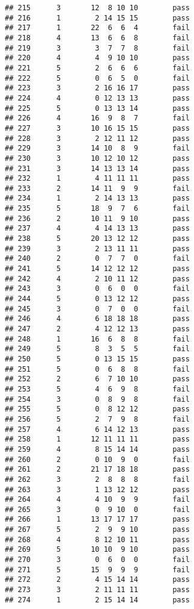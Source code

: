 \documentclass[
]{article}
\begin{document}
\begin{verbatim}
## 215      3       12  8 10 10        pass
## 216      1        2 14 15 15        pass
## 217      1       22  6  6  4        fail
## 218      4       13  6  6  8        fail
## 219      3        3  7  7  8        fail
## 220      4        4  9 10 10        pass
## 221      5        2  6  6  6        fail
## 222      5        0  6  5  0        fail
## 223      3        2 16 16 17        pass
## 224      4        0 12 13 13        pass
## 225      5        0 13 13 14        pass
## 226      4       16  9  8  7        fail
## 227      3       10 16 15 15        pass
## 228      3        2 12 11 12        pass
## 229      3       14 10  8  9        fail
## 230      3       10 12 10 12        pass
## 231      3       14 13 13 14        pass
## 232      1        4 11 11 11        pass
## 233      2       14 11  9  9        fail
## 234      1        2 14 13 13        pass
## 235      5       18  9  7  6        fail
## 236      2       10 11  9 10        pass
## 237      4        4 14 13 13        pass
## 238      5       20 13 12 12        pass
## 239      3        2 13 11 11        pass
## 240      2        0  7  7  0        fail
## 241      5       14 12 12 12        pass
## 242      4        2 10 11 12        pass
## 243      3        0  6  0  0        fail
## 244      5        0 13 12 12        pass
## 245      3        0  7  0  0        fail
## 246      4        6 18 18 18        pass
## 247      2        4 12 12 13        pass
## 248      1       16  6  8  8        fail
## 249      5        8  3  5  5        fail
## 250      5        0 13 15 15        pass
## 251      5        0  6  8  8        fail
## 252      2        6  7 10 10        pass
## 253      5        4  6  9  8        fail
## 254      3        0  8  9  8        fail
## 255      5        0  8 12 12        pass
## 256      5        2  7  9  8        fail
## 257      4        6 14 12 13        pass
## 258      1       12 11 11 11        pass
## 259      4        8 15 14 14        pass
## 260      2        0 10  9  0        fail
## 261      2       21 17 18 18        pass
## 262      3        2  8  8  8        fail
## 263      3        1 13 12 12        pass
## 264      4        4 10  9  9        fail
## 265      3        0  9 10  0        fail
## 266      1       13 17 17 17        pass
## 267      5        2  9  9 10        pass
## 268      4        8 12 10 11        pass
## 269      5       10 10  9 10        pass
## 270      3        0  6  0  0        fail
## 271      5       15  9  9  9        fail
## 272      2        4 15 14 14        pass
## 273      3        2 11 11 11        pass
## 274      1        2 15 14 14        pass

\end{verbatim}
\end{document}
